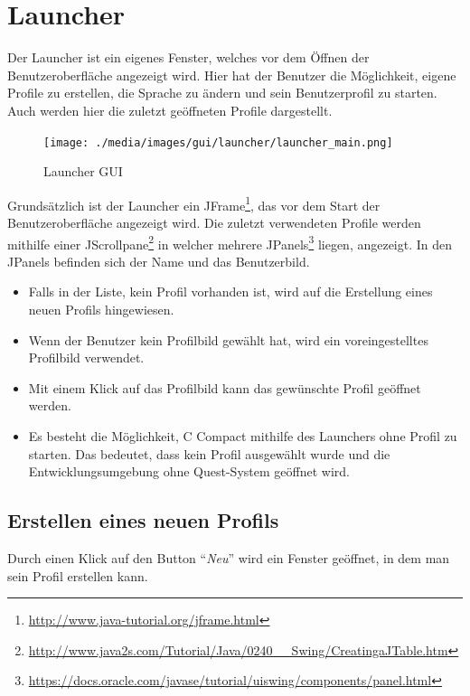 \section{Launcher}
Der Launcher ist ein eigenes Fenster, welches vor dem Öffnen der Benutzeroberfläche angezeigt wird. Hier hat der Benutzer die Möglichkeit, eigene Profile zu erstellen, die Sprache zu ändern und sein Benutzerprofil zu starten. Auch werden hier die zuletzt geöffneten Profile dargestellt.

\begin{figure}[h] 
  \centering
     \texttt{[image: ./media/images/gui/launcher/launcher\_main.png]}
  \caption{Launcher GUI}
  \label{fig:launcher_GUI}
\end{figure}

Grundsätzlich ist der Launcher ein JFrame\footnote{\url{http://www.java-tutorial.org/jframe.html}}, das vor dem Start der Benutzeroberfläche angezeigt wird. Die zuletzt verwendeten Profile werden mithilfe einer JScrollpane\footnote{\url{http://www.java2s.com/Tutorial/Java/0240__Swing/CreatingaJTable.htm}}  in welcher mehrere JPanels\footnote{\url{https://docs.oracle.com/javase/tutorial/uiswing/components/panel.html}} liegen, angezeigt. In den JPanels befinden sich der Name und das Benutzerbild.

\begin{itemize}
\item Falls in der Liste, kein Profil vorhanden ist, wird auf die Erstellung eines neuen Profils hingewiesen.
\item Wenn der Benutzer kein Profilbild gewählt hat, wird ein voreingestelltes Profilbild verwendet.
\item Mit einem Klick auf das Profilbild kann das gewünschte Profil geöffnet werden.
\item Es besteht die Möglichkeit, C Compact mithilfe des Launchers ohne Profil zu starten. Das bedeutet, dass kein Profil ausgewählt wurde und die Entwicklungsumgebung ohne Quest-System geöffnet wird.
\end{itemize}

\subsection{Erstellen eines neuen Profils}
Durch einen Klick auf den Button "`\textit{Neu}"' wird ein Fenster geöffnet, in dem man sein Profil erstellen kann.  

